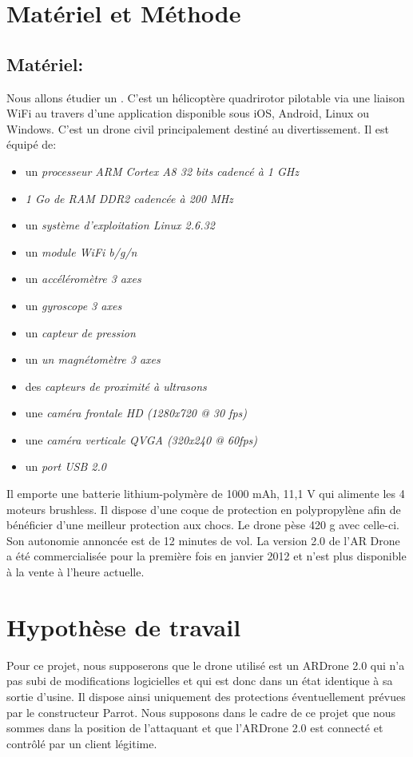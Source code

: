 \section{Matériel et Méthode}
\subsection{Matériel: }
Nous allons étudier un . C'est un hélicoptère quadrirotor pilotable via une liaison WiFi au travers d'une application disponible sous iOS, Android, Linux ou Windows. C'est un drone civil principalement destiné au divertissement. Il est équipé de:
\medbreak
\begin{itemize}
    \item un \textit{processeur ARM Cortex A8 32 bits cadencé à 1 GHz}
    \item \textit{1 Go de RAM DDR2 cadencée à 200 MHz}
    \item un \textit{système d'exploitation Linux 2.6.32}
    \item un \textit{module WiFi b/g/n}
    \item un \textit{accéléromètre 3 axes}
    \item un \textit{gyroscope 3 axes}
    \item un \textit{capteur de pression}
    \item un \textit{un magnétomètre 3 axes}
    \item des \textit{capteurs de proximité à ultrasons}
    \item une \textit{caméra frontale HD (1280x720 @ 30 fps)}
    \item une \textit{caméra verticale QVGA (320x240 @ 60fps)}
    \item un \textit{port USB 2.0}
\end{itemize}
\medbreak
Il emporte une batterie lithium-polymère de 1000 mAh, 11,1 V qui alimente les 4 moteurs brushless. Il dispose d'une coque de protection en polypropylène afin de bénéficier d'une meilleur protection aux chocs. Le drone pèse 420 g avec celle-ci. Son autonomie annoncée est de 12 minutes de vol. La version 2.0 de l'AR Drone a été commercialisée pour la première fois en janvier 2012 et n'est plus disponible à la vente à l'heure actuelle.


\section{Hypothèse de travail}
Pour ce projet, nous supposerons que le drone utilisé est un ARDrone 2.0 qui n'a pas subi de modifications logicielles et qui est donc dans un état identique à sa sortie d'usine. Il dispose ainsi uniquement des protections éventuellement prévues par le constructeur Parrot. Nous supposons dans le cadre de ce projet que nous sommes  dans la position de l'attaquant et que l'ARDrone 2.0 est connecté et contrôlé par un client légitime.
